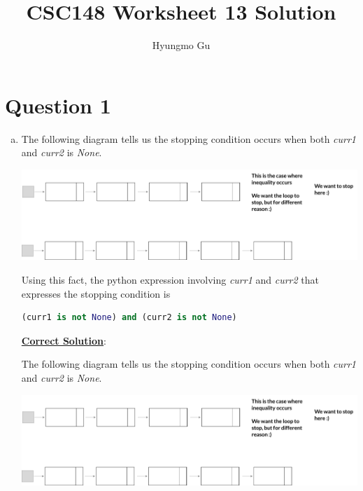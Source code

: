 \documentclass[12pt]{article}
\begin{document}
\title{CSC148 Worksheet 13 Solution}
\author{Hyungmo Gu}
\maketitle

\section*{Question 1}
\begin{enumerate}[a.]
    \item

    The following diagram tells us the stopping condition occurs when both
    \textit{curr1} and \textit{curr2} is \textit{None}.

    \begin{center}
    \includegraphics[width=\linewidth]{images/worksheet_13_q1a_solution.png}
    \end{center}

    \bigskip

    Using this fact, the python expression involving \textit{curr1}
    and \textit{curr2} that expresses the stopping condition is

    \bigskip

    \begin{lstlisting}[language=Python]
    (curr1 is not None) and (curr2 is not None)
    \end{lstlisting}

    \newpage

    \begin{mdframed}
    \underline{\textbf{Correct Solution}}:

    \bigskip

    The following diagram tells us the stopping condition occurs when both
    \textit{curr1} and \textit{curr2} is \textit{None}.

    \begin{center}
    \includegraphics[width=\linewidth]{images/worksheet_13_q1a_solution.png}
    \end{center}


\end{mdframed}
\end{enumerate}
\end{document}
